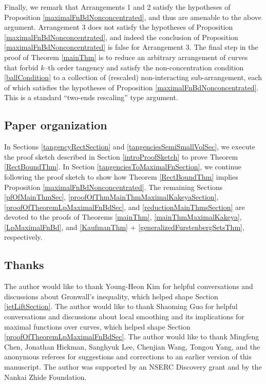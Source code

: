 \documentclass[letterpaper, reqno,11pt]{article}
\numberwithin{equation}{section}
\numberwithin{thm}{section}
\theoremstyle{remark}
\begin{document}
Finally, we remark that Arrangements 1 and 2 satisfy the hypotheses of Proposition \ref{maximalFnBdNonconcentrated}, and thus are amenable to the above argument. Arrangement 3 does not satisfy the hypotheses of Proposition \ref{maximalFnBdNonconcentrated}, and indeed the conclusion of Proposition \ref{maximalFnBdNonconcentrated} is false for Arrangement 3. The final step in the proof of Theorem \ref{mainThm} is to reduce an arbitrary arrangement of curves that forbid $k$--th order tangency and satisfy the non-concentration condition \eqref{ballCondition} to a collection of (rescaled) non-interacting sub-arrangement, each of which satisfies the hypotheses of Proposition \ref{maximalFnBdNonconcentrated}. This is a standard ``two-ends rescaling'' type argument.



\subsection{Paper organization}
In Sections \ref{tangencyRectSection} and \ref{tangenciesSemiSmallVolSec}, we execute the proof sketch described in Section \ref{introProofSketch} to prove Theorem \ref{RectBoundThm}. In Section \ref{tangenciesToMaximalFnSection}, we continue following the proof sketch to show how Theorem  \ref{RectBoundThm} implies Proposition \ref{maximalFnBdNonconcentrated}. The remaining Sections \ref{pfOfMainThmSec}, \ref{proofOfThmMainThmMaximalKakeyaSection}, \ref{proofOfTheoremLpMaximalFnBdSec}, and \ref{reductionMainThmsSection} are devoted to the proofs of Theorems \ref{mainThm}, \ref{mainThmMaximalKakeya}, \ref{LpMaximalFnBd}, and \ref{KaufmanThm} + \ref{generalizedFurstenbergSetsThm}, respectively.

\subsection{Thanks}
The author would like to thank Young-Heon Kim for helpful conversations and discussions about Gronwall's inequality, which helped shape Section \ref{jetLiftSection}. The author would like to thank Shaoming Guo for helpful conversations and discussions about local smoothing and its implications for maximal functions over curves, which helped shape Section \ref{proofOfTheoremLpMaximalFnBdSec}. The author would like to thank Mingfeng Chen, Jonathan Hickman, Sanghyuk Lee, Chenjian Wang, Tongou Yang, and the anonymous referees for suggestions and corrections to an earlier version of this manuscript. The author was supported by an NSERC Discovery grant and by the Nankai Zhide Foundation.
\end{document}
